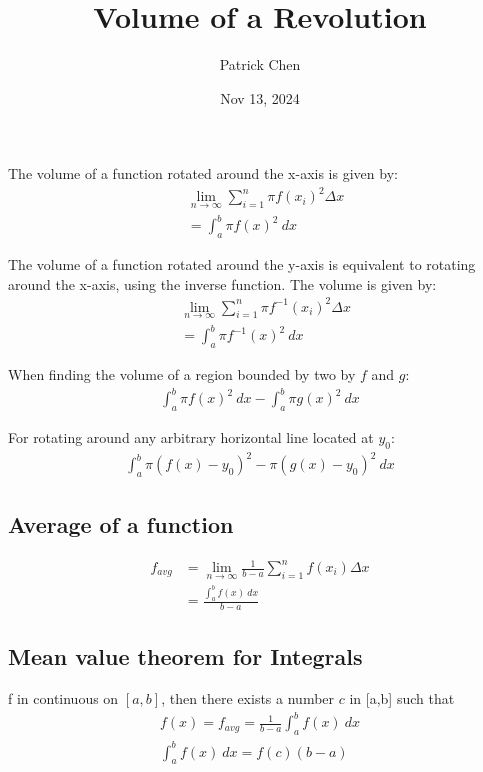 \documentclass{article}
\title{Volume of a Revolution}
\author{Patrick Chen}
\date{Nov 13, 2024}
\theoremstyle{mytheoremstyle}
\theoremstyle{mytheoremstyle}
\theoremstyle{myproblemstyle}
\begin{document}
    \maketitle
    The volume of a function rotated around the x-axis is given by:
    \begin{align*}
        &\lim_{n\to \infty} \sum_{i=1}^{n} \pi f(x_i)^2\Delta x \\
        &=\int_{a}^{b} \pi f(x)^2 \ dx
    \end{align*}

    The volume of a function rotated around the y-axis is equivalent to rotating
    around the x-axis, using the inverse function. The volume is given by:
    \begin{align*}
        &\lim_{n\to \infty} \sum_{i=1}^{n} \pi f^{-1}(x_i)^2\Delta x \\
        &=\int_{a}^{b} \pi f^{-1}(x)^2 \ dx
    \end{align*}

    When finding the volume of a region bounded by two by $f$ and $g$:
    \begin{align*}
        \int_{a}^{b} \pi f(x)^2 \ dx - \int_{a}^{b} \pi g(x)^2 \ dx
    \end{align*}

    For rotating around any arbitrary horizontal line located at $y_0$:
    \begin{align*}
        \int_{a}^{b} \pi (f(x)-y_0)^2 - \pi (g(x)-y_0)^2 \ dx
    \end{align*}

    \subsection*{Average of a function}
    \begin{align*}
        f_{avg} &= \lim_{n\to \infty} \frac{1}{b-a} \sum_{i=1}^{n} f(x_i) \Delta x \\
        &= \frac{\int_{a}^{b} f(x) \ dx}{b-a}
    \end{align*}

    \subsection*{Mean value theorem for Integrals}
    f in continuous on $[a,b]$, then there exists a number $c$ in [a,b] such that
    \begin{align*}
        f(x) = f_{avg} = \frac{1}{b-a} \int_{a}^{b} f(x) \ dx \\
        \int_{a}^{b} f(x) \ dx = f(c) (b-a)
    \end{align*}
\end{document}
